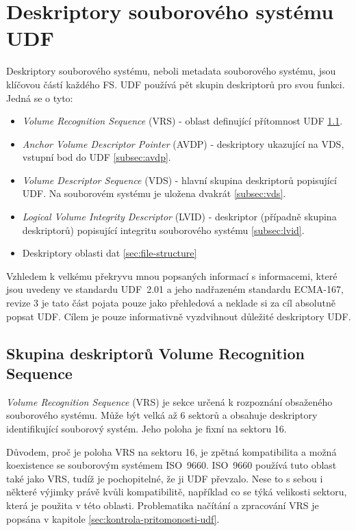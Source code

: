 \section{Deskriptory souborového systému UDF}
\label{sec:deskriptory-udf}
Deskriptory souborového systému, neboli metadata souborového systému, jsou klíčovou částí každého FS. UDF používá pět skupin deskriptorů pro svou funkci. Jedná se o tyto:
\begin{itemize}
    \item \textit{Volume Recognition Sequence} (VRS) - oblast definující přítomnost UDF \ref{subsec:vrs}.
    \item \textit{Anchor Volume Descriptor Pointer} (AVDP) - deskriptory ukazující na VDS, vstupní bod do UDF \ref{subsec:avdp}.
    \item \textit{Volume Descriptor Sequence} (VDS) - hlavní skupina deskriptorů popisující UDF. Na souborovém systému je uložena dvakrát \ref{subsec:vds}.
    \item \textit{Logical Volume Integrity Descriptor} (LVID) - deskriptor (případně skupina deskriptorů) popisující integritu souborového systému \ref{subsec:lvid}. 
    \item Deskriptory oblasti dat \ref{sec:file-structure}
\end{itemize}
Vzhledem k velkému překryvu mnou popsaných informací s informacemi, které jsou uvedeny ve standardu UDF~2.01 \cite{osta-udf-0201} a jeho nadřazeném standardu ECMA-167, revize 3 \cite{ecma-167} je tato část pojata pouze jako přehledová a neklade si za cíl absolutně popsat UDF. Cílem je pouze informativně vyzdvihnout důležité deskriptory UDF.

\subsection{Skupina deskriptorů Volume Recognition Sequence}
\label{subsec:vrs}
\textit{Volume Recognition Sequence} (VRS) je sekce určená k rozpoznání obsaženého souborového systému. Může být velká až 6 sektorů a obsahuje deskriptory identifikující souborový systém. Jeho poloha je fixní na sektoru 16.

Důvodem, proč je poloha VRS na sektoru 16, je zpětná kompatibilita a možná koexistence se souborovým systémem ISO~9660. ISO~9660 používá tuto oblast také jako VRS, tudíž je pochopitelné, že ji UDF převzalo. Nese to s sebou i některé výjimky právě kvůli kompatibilitě, například co se týká velikosti sektoru, která je použita v této oblasti. Problematika načítání a zpracování VRS je popsána v kapitole \ref{sec:kontrola-pritomonosti-udf}.

